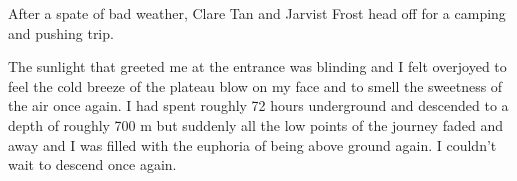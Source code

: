\begin{marginfigure}
\checkoddpage \ifoddpage \forcerectofloat \else \forceversofloat \fi
\centering
 \caption{After a spate of bad weather, Clare Tan and Jarvist Frost head off for a camping and pushing trip. }
 \label{clare jarv push}
\end{marginfigure}


The sunlight that greeted me at the entrance was blinding and I felt
overjoyed to feel the cold breeze of the plateau blow on my face and to
smell the sweetness of the air once again. I had spent roughly 72 hours
underground and descended to a depth of roughly 700 m but suddenly all
the low points of the journey faded and away and I was filled with the
euphoria of being above ground again. I couldn't wait to descend once
again.


